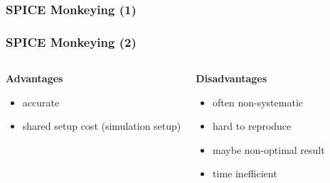 \documentclass[10pt, aspectratio=169]{beamer}
\newcommand{\edaload}[7]{
\fill[lightgray] (#1,#2+0.05) rectangle (#1+#3,#2+0.05+#4/100*0.5);
\draw[thick] (#1,#2+0.05) rectangle (#1+#3,#2+0.55);
\node[inner sep=0pt] (designer) at (#1+#3/2,#2+0.3) {\faUser};

\fill[lightgray] (#1,#2-0.55) rectangle (#1+#3,#2-0.55+#5/100*0.5);
\draw[thick] (#1,#2-0.55) rectangle (#1+#3,#2-0.05);
\node[inner sep=0pt] (machine) at (#1+#3/2,#2-0.3) {\faLaptop};

\ifthenelse{\isempty{#6}}%
  {}%
  {\node[anchor=south] at (#1+#3/2,#2+0.6) {#6};}%


\ifthenelse{\isempty{#7}}%
  {}%
  {
    \draw[thin] (#1,#2-0.65) -- (#1,#2-1);
    \draw[thin] (#1+#3,#2-0.65) -- (#1+#3,#2-1);

    \draw[{Latex[round,scale=0.8]}-{Latex[round,scale=0.8]}] (#1,#2-0.8) -- (#1+#3,#2-0.8)
        node [midway,anchor=north,inner sep=2pt] {#7};
  }
}
\begin{document}

\begin{frame}
\frametitle{SPICE Monkeying (1)}
\begin{center}
\begin{tikzpicture}[node distance=1.3cm]

\end{tikzpicture}
\end{center}
\end{frame}

\begin{frame}
\frametitle{SPICE Monkeying (2)}
\begin{columns}[t]

\begin{center}
\textbf{Advantages}
\begin{itemize}
  \item accurate
  \item shared setup cost (simulation setup)
\end{itemize}
\end{center}
\begin{center}
\textbf{Disadvantages}
\begin{itemize}
  \item often non-systematic
  \item hard to reproduce
  \item maybe non-optimal result
  \item time inefficient
\end{itemize}
\end{center}
\end{columns}
\end{frame}
\end{document}
